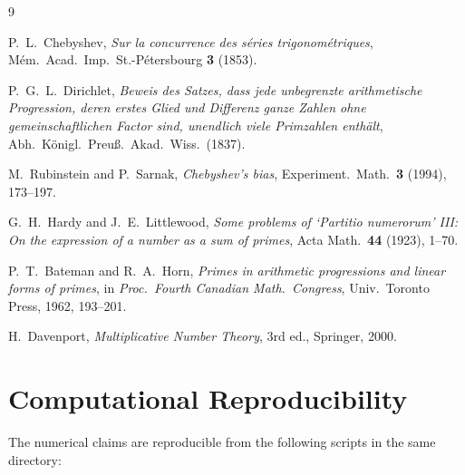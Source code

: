 \documentclass[11pt,a4paper]{article}
\begin{document}
\begin{thebibliography}{9}

P.~L.~Chebyshev,
\emph{Sur la concurrence des s\'eries trigonom\'etriques},
M\'em.\ Acad.\ Imp.\ St.-P\'etersbourg \textbf{3} (1853).

P.~G.~L.~Dirichlet,
\emph{Beweis des Satzes, dass jede unbegrenzte arithmetische Progression,
deren erstes Glied und Differenz ganze Zahlen ohne gemeinschaftlichen
Factor sind, unendlich viele Primzahlen enth\"alt},
Abh.\ K\"onigl.\ Preu\ss.\ Akad.\ Wiss.\ (1837).

M.~Rubinstein and P.~Sarnak,
\emph{Chebyshev's bias},
Experiment.\ Math.\ \textbf{3} (1994), 173--197.

G.~H.~Hardy and J.~E.~Littlewood,
\emph{Some problems of `Partitio numerorum' III:
On the expression of a number as a sum of primes},
Acta Math.\ \textbf{44} (1923), 1--70.

P.~T.~Bateman and R.~A.~Horn,
\emph{Primes in arithmetic progressions and linear forms of primes},
in \emph{Proc.\ Fourth Canadian Math.\ Congress},
Univ.\ Toronto Press, 1962, 193--201.

H.~Davenport,
\emph{Multiplicative Number Theory},
3rd ed., Springer, 2000.

\end{thebibliography}

\appendix
\section{Computational Reproducibility}

The numerical claims are reproducible from the following scripts in the
same directory:
\end{document}
